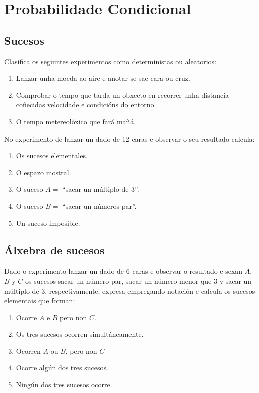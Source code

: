 \chapter{Probabilidade Condicional}
\setcounter{exercicio}{0}

\section{Sucesos}

\Exercicio  Clasifica os seguintes experimentos como deterministas ou aleatorios:

\begin{enumerate}[topsep=0pt,itemsep=0pt]
	\item Lanzar unha moeda ao aire e anotar se sae cara ou cruz.
	\item Comprobar o tempo que tarda un obxecto en recorrer unha distancia coñecidas velocidade e condicións do entorno.
	\item O tempo metereolóxico que fará mañá.
\end{enumerate}


\Exercicio  No experimento de lanzar un dado de 12 caras e observar o seu resultado	calcula:

\begin{enumerate}[topsep=0pt,itemsep=0pt]
	\item Os sucesos elementales.
	\item O espazo mostral.
	\item O suceso $A =$ “sacar un múltiplo de 3”.
	\item O suceso $B =$ “sacar un números par”.
	\item Un suceso imposible.
\end{enumerate}

\section{Álxebra de sucesos}

\Exercicio  Dado o experimento lanzar un dado de 6 caras e observar o resultado e sexan $A$, $B$ y $C$ os sucesos sacar un número par, sacar un número menor que 3 y sacar un múltiplo de 3, respectivamente;  expresa empregando notación e calcula os sucesos elementais que forman:

\begin{enumerate}[topsep=0pt,itemsep=0pt]
	\item Ocorre $A$ e $B$ pero non $C$.
	\item Os tres sucesos ocorren simultáneamente.
	\item Ocorren $A$ ou $B$, pero non $C$
	\item Ocorre algún dos tres sucesos.
	\item Ningún dos tres sucesos ocorre.
\end{enumerate}


